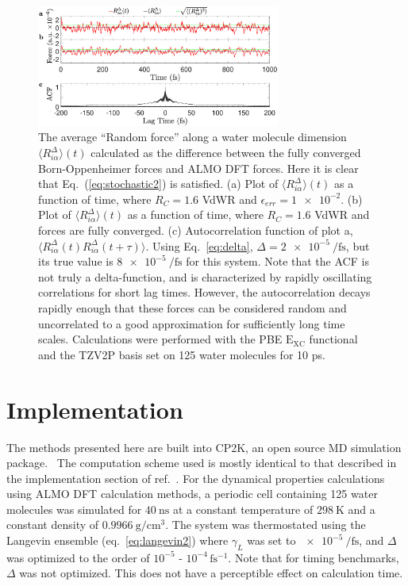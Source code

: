 \documentclass[10pt,aps,prl,twocolumn,amsmath,amssymb,superscriptaddress,longbibliography]{revtex4-1}
\begin{document}
\begin{figure}
\includegraphics[trim={0.5cm 0.7cm 0.5cm 0cm},clip,width=8cm]{DeltaForceComparison_with_ACF.eps}
\caption{\label{fig:randomforce}The average ``Random force'' along a water molecule dimension $\langle R^{\Delta}_{i\alpha} \rangle (t)$ calculated as the difference between the fully converged Born-Oppenheimer forces and ALMO DFT forces. Here it is clear that Eq.\ (\ref{eq:stochastic2}) is satisfied. 
(a) Plot of $\langle R^{\Delta}_{i\alpha} \rangle (t)$ as a function of time, where $R_{C} = 1.6$ VdWR and $\epsilon_{err} = \num{1e-2}$.
(b) Plot of $\langle R^{\Delta}_{i\alpha} \rangle (t)$ as a function of time, where $R_{C} = 1.6$ VdWR and forces are fully converged.
(c) Autocorrelation function of plot a, $\langle R^{\Delta}_{i\alpha} (t) R^{\Delta}_{i\alpha} (t+\tau) \rangle $.
Using Eq.\ \ref{eq:delta}, $\Delta = \SI{2e-5}{\per\fs}$, but its true value is $\SI{8e-5}{\per\fs}$ for this system.
Note that the  ACF is not truly a delta-function, and is characterized by rapidly oscillating correlations for short lag times. 
However, the autocorrelation decays rapidly enough that these forces can be considered random and uncorrelated to a good approximation for sufficiently long time scales. 
Calculations were performed with the PBE $\mathrm{E_{XC}}$ functional and the TZV2P basis set on 125 water molecules for 10 ps.}
\end{figure}

\section{Implementation}

The methods presented here are built into CP2K, an open source MD simulation package.~\cite{www:cp2k} 
The computation scheme used is mostly identical to that described in the implementation section of ref.\ . 
For the dynamical properties calculations using ALMO DFT calculation methods, a periodic cell containing 125 water molecules was simulated for $\SI{40}{\ns}$ at a constant temperature of $\SI{298}{\K}$ and a constant density of $\SI{0.9966}{\g\per\cm^{3}}$. 
The system was thermostated using the Langevin ensemble (eq.\ \ref{eq:langevin2}) where $\gamma_L$ was set to $\SI{e-5}{\per\fs}$, and $\Delta$ was optimized to the order of $10^{-5}$ - $10^{-4}\, \mathrm{fs^{-1}}$. 
Note that for timing benchmarks, $\Delta$ was not optimized. 
This does not have a perceptible effect on calculation time.
\end{document}
